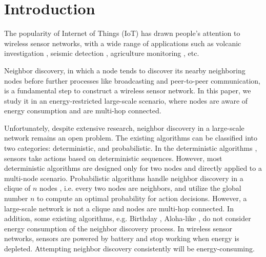\section{Introduction}








The popularity of Internet of Things (IoT) has drawn people's attention to wireless sensor networks\cite{akyildiz2002wireless}, with a wide range of applications such as volcanic investigation \cite{werner2006deploying}, seismic detection \cite{suzuki2007high}, agriculture monitoring \cite{wang2010l3sn}, etc. 

Neighbor discovery, in which a node tends to discover its nearby neighboring nodes before further processes like broadcasting and peer-to-peer communication, is a fundamental step to construct a wireless sensor network. In this paper, we study it in an energy-restricted large-scale scenario, where nodes are aware of energy consumption and  are multi-hop connected.

Unfortunately, despite extensive research, neighbor discovery in a large-scale network remains an open problem.
The existing algorithms can be classified into two categories: deterministic, and probabilistic.
In the deterministic algorithms \cite{dutta2008practical, kandhalu2010u, bakht2012searchlight, sun2014hello,  chen2015heterogeneous, qiu2016talk}, sensors take actions based on deterministic sequences.
However, most deterministic algorithms are designed only for two nodes and directly applied to a multi-node scenario. Probabilistic algorithms handle neighbor discovery in a clique of $n$ nodes\cite{mcglynn2001birthday, vasudevan2009neighbor, you2011aloha, song2014probabilistic} , i.e. every two nodes are neighbors, and utilize the global number $n$ to compute an optimal probability for action decisions. However, a large-scale network is not a clique and nodes are multi-hop connected. In addition, some existing algorithms, e.g. Birthday \cite{mcglynn2001birthday}, Aloha-like \cite{vasudevan2009neighbor}, do not consider energy consumption of the neighbor discovery process. In wireless sensor networks, sensors are powered by battery and stop working when energy is  depleted. Attempting neighbor discovery consistently will be energy-consuming. 

